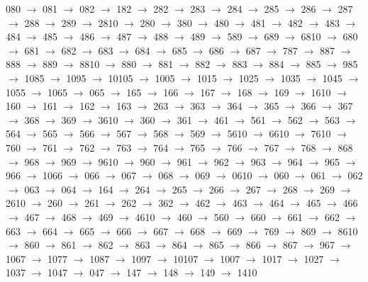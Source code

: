080 $\rightarrow$ 081 $\rightarrow$ 082 $\rightarrow$ 182 $\rightarrow$ 282 $\rightarrow$ 283 $\rightarrow$ 284 $\rightarrow$ 285 $\rightarrow$ 286 $\rightarrow$ 287 $\rightarrow$ 288 $\rightarrow$ 289 $\rightarrow$ 2810 $\rightarrow$ 280 $\rightarrow$ 380 $\rightarrow$ 480 $\rightarrow$ 481 $\rightarrow$ 482 $\rightarrow$ 483 $\rightarrow$ 484 $\rightarrow$ 485 $\rightarrow$ 486 $\rightarrow$ 487 $\rightarrow$ 488 $\rightarrow$ 489 $\rightarrow$ 589 $\rightarrow$ 689 $\rightarrow$ 6810 $\rightarrow$ 680 $\rightarrow$ 681 $\rightarrow$ 682 $\rightarrow$ 683 $\rightarrow$ 684 $\rightarrow$ 685 $\rightarrow$ 686 $\rightarrow$ 687 $\rightarrow$ 787 $\rightarrow$ 887 $\rightarrow$ 888 $\rightarrow$ 889 $\rightarrow$ 8810 $\rightarrow$ 880 $\rightarrow$ 881 $\rightarrow$ 882 $\rightarrow$ 883 $\rightarrow$ 884 $\rightarrow$ 885 $\rightarrow$ 985 $\rightarrow$ 1085 $\rightarrow$ 1095 $\rightarrow$ 10105 $\rightarrow$ 1005 $\rightarrow$ 1015 $\rightarrow$ 1025 $\rightarrow$ 1035 $\rightarrow$ 1045 $\rightarrow$ 1055 $\rightarrow$ 1065 $\rightarrow$ 065 $\rightarrow$ 165 $\rightarrow$ 166 $\rightarrow$ 167 $\rightarrow$ 168 $\rightarrow$ 169 $\rightarrow$ 1610 $\rightarrow$ 160 $\rightarrow$ 161 $\rightarrow$ 162 $\rightarrow$ 163 $\rightarrow$ 263 $\rightarrow$ 363 $\rightarrow$ 364 $\rightarrow$ 365 $\rightarrow$ 366 $\rightarrow$ 367 $\rightarrow$ 368 $\rightarrow$ 369 $\rightarrow$ 3610 $\rightarrow$ 360 $\rightarrow$ 361 $\rightarrow$ 461 $\rightarrow$ 561 $\rightarrow$ 562 $\rightarrow$ 563 $\rightarrow$ 564 $\rightarrow$ 565 $\rightarrow$ 566 $\rightarrow$ 567 $\rightarrow$ 568 $\rightarrow$ 569 $\rightarrow$ 5610 $\rightarrow$ 6610 $\rightarrow$ 7610 $\rightarrow$ 760 $\rightarrow$ 761 $\rightarrow$ 762 $\rightarrow$ 763 $\rightarrow$ 764 $\rightarrow$ 765 $\rightarrow$ 766 $\rightarrow$ 767 $\rightarrow$ 768 $\rightarrow$ 868 $\rightarrow$ 968 $\rightarrow$ 969 $\rightarrow$ 9610 $\rightarrow$ 960 $\rightarrow$ 961 $\rightarrow$ 962 $\rightarrow$ 963 $\rightarrow$ 964 $\rightarrow$ 965 $\rightarrow$ 966 $\rightarrow$ 1066 $\rightarrow$ 066 $\rightarrow$ 067 $\rightarrow$ 068 $\rightarrow$ 069 $\rightarrow$ 0610 $\rightarrow$ 060 $\rightarrow$ 061 $\rightarrow$ 062 $\rightarrow$ 063 $\rightarrow$ 064 $\rightarrow$ 164 $\rightarrow$ 264 $\rightarrow$ 265 $\rightarrow$ 266 $\rightarrow$ 267 $\rightarrow$ 268 $\rightarrow$ 269 $\rightarrow$ 2610 $\rightarrow$ 260 $\rightarrow$ 261 $\rightarrow$ 262 $\rightarrow$ 362 $\rightarrow$ 462 $\rightarrow$ 463 $\rightarrow$ 464 $\rightarrow$ 465 $\rightarrow$ 466 $\rightarrow$ 467 $\rightarrow$ 468 $\rightarrow$ 469 $\rightarrow$ 4610 $\rightarrow$ 460 $\rightarrow$ 560 $\rightarrow$ 660 $\rightarrow$ 661 $\rightarrow$ 662 $\rightarrow$ 663 $\rightarrow$ 664 $\rightarrow$ 665 $\rightarrow$ 666 $\rightarrow$ 667 $\rightarrow$ 668 $\rightarrow$ 669 $\rightarrow$ 769 $\rightarrow$ 869 $\rightarrow$ 8610 $\rightarrow$ 860 $\rightarrow$ 861 $\rightarrow$ 862 $\rightarrow$ 863 $\rightarrow$ 864 $\rightarrow$ 865 $\rightarrow$ 866 $\rightarrow$ 867 $\rightarrow$ 967 $\rightarrow$ 1067 $\rightarrow$ 1077 $\rightarrow$ 1087 $\rightarrow$ 1097 $\rightarrow$ 10107 $\rightarrow$ 1007 $\rightarrow$ 1017 $\rightarrow$ 1027 $\rightarrow$ 1037 $\rightarrow$ 1047 $\rightarrow$ 047 $\rightarrow$ 147 $\rightarrow$ 148 $\rightarrow$ 149 $\rightarrow$ 1410 